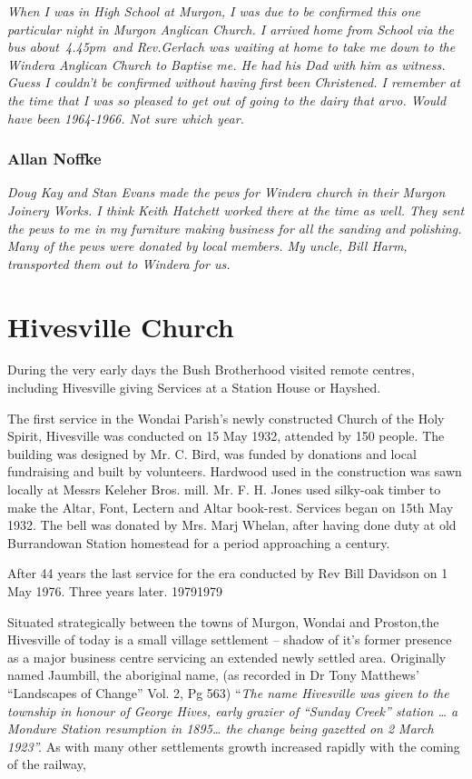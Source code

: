 \emph{When I was in High School at Murgon, I was due to be confirmed this one particular night in Murgon Anglican Church. I arrived home from School via the bus about~4.45pm~and Rev.Gerlach was waiting at home to take me down to the Windera Anglican Church to Baptise me. He had his Dad with him as witness. Guess I couldn't be confirmed without having first been Christened. I remember at the time that I was so pleased to get out of going to the dairy that arvo. Would have been 1964-1966. Not sure which year.}

\hypertarget{allan-noffke}{%
\subsubsection{Allan Noffke}\label{allan-noffke}}

\emph{Doug Kay and Stan Evans made the pews for Windera church in their Murgon Joinery Works. I think Keith Hatchett worked there at the time as well. They sent the pews to me in my furniture making business for all the sanding and polishing. Many of the pews were donated by local members. My uncle, Bill Harm, transported them out to Windera for us.}

\hypertarget{hivesville-church}{%
\section{Hivesville Church}\label{hivesville-church}}

During the very early days the Bush Brotherhood visited remote centres, including Hivesville giving Services at a Station House or Hayshed.

The first service in the Wondai Parish's newly constructed Church of the Holy Spirit, Hivesville was conducted on 15 May 1932, attended by 150 people. The building was designed by Mr. C. Bird, was funded by donations and local fundraising and built by volunteers. Hardwood used in the construction was sawn locally at Messrs Keleher Bros. mill. Mr. F. H. Jones used silky-oak timber to make the Altar, Font, Lectern and Altar book-rest. Services began on 15th May 1932. The bell was donated by Mrs. Marj Whelan, after having done duty at old Burrandowan Station homestead for a period approaching a century.

After 44 years the last service for the era conducted by Rev Bill Davidson on 1 May 1976. Three years later. 19791979

Situated strategically between the towns of Murgon, Wondai and Proston,the Hivesville of today is a small village settlement -- shadow of it's former presence as a major business centre servicing an extended newly settled area. Originally named Jaumbill, the aboriginal name, (as recorded in Dr Tony Matthews' ``Landscapes of Change'' Vol. 2, Pg 563) ``\emph{The name Hivesville was given to the township in honour of George Hives, early grazier of ``Sunday Creek'' station \ldots{} a Mondure Station resumption in 1895\ldots{} the change being gazetted on 2 March 1923''.} As with many other settlements growth increased rapidly with the coming of the railway,

